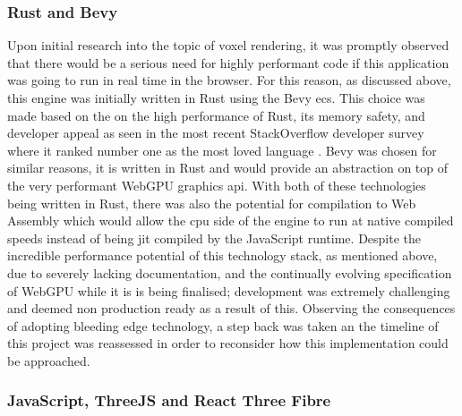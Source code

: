 \documentclass[titlepage]{article}
\begin{document}
\subsubsection{Rust and Bevy}

Upon initial research into the topic of voxel rendering, it was promptly observed that there would be a serious need for highly performant code if this application was going to run in real time in the browser. For this reason, as discussed above, this engine was initially written in Rust using the Bevy \gls{ecs}. This choice was made based on the on the high performance of Rust, its memory safety, and developer appeal as seen in the most recent StackOverflow developer survey where it ranked number one as the most loved language \cite{survey}. Bevy was chosen for similar reasons, it is written in Rust and would provide an abstraction on top of the very performant WebGPU graphics \gls{api}. With both of these technologies being written in Rust, there was also the potential for compilation to Web Assembly which would allow the \gls{cpu} side of the engine to run at native compiled speeds instead of being \gls{jit} compiled by the JavaScript runtime. Despite the incredible performance potential of this technology stack, as mentioned above, due to severely lacking documentation, and the continually evolving specification of WebGPU while it is is being finalised; development was extremely challenging and deemed non production ready as a result of this. Observing the consequences of adopting bleeding edge technology, a step back was taken an the timeline of this project was reassessed in order to reconsider how this implementation could be approached.

\subsubsection{JavaScript, ThreeJS and React Three Fibre}
\end{document}
